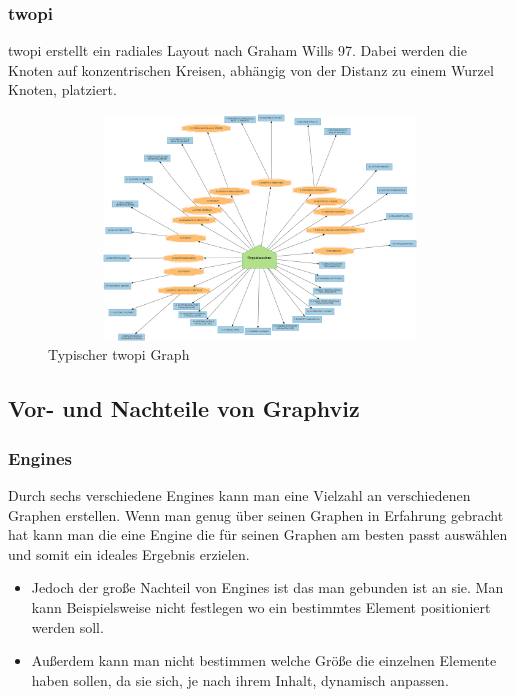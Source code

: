 \noindent
\subsubsection{twopi}
\fib{}
\noindent
twopi erstellt ein radiales Layout nach Graham Wills 97. Dabei werden die Knoten auf konzentrischen Kreisen, abhängig von der Distanz zu einem Wurzel Knoten, platziert.

\begin{figure}[H]
	\begin{center}
		\includegraphics[width=14cm, height=6cm]{images/twopi.png}
		\caption{Typischer twopi Graph}
		\label{twopi}
	\end{center}
\end{figure}

\subsection{Vor- und Nachteile von Graphviz}
\subsubsection{Engines}
\noindent
Durch sechs verschiedene Engines kann man eine Vielzahl an verschiedenen Graphen erstellen. Wenn man genug über seinen Graphen in Erfahrung gebracht hat kann man die eine Engine die für seinen Graphen am besten passt auswählen und somit ein ideales Ergebnis erzielen.

\noindent
\begin{itemize}
	\item Jedoch der große Nachteil von Engines ist das man gebunden ist an sie. Man kann Beispielsweise nicht festlegen wo ein bestimmtes Element positioniert werden soll.
	\item  Außerdem kann man nicht bestimmen welche Größe die einzelnen Elemente haben sollen, da sie sich, je nach ihrem Inhalt, dynamisch anpassen.
\end{itemize}

